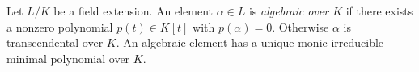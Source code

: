 
Let $L/K$ be a field extension. An element $\alpha\in L$ is \emph{algebraic over $K$} if there exists a nonzero polynomial $p(t)\in K[t]$ with $p(\alpha)=0$. Otherwise $\alpha$ is transcendental over $K$. An algebraic element has a unique monic irreducible minimal polynomial over $K$.
